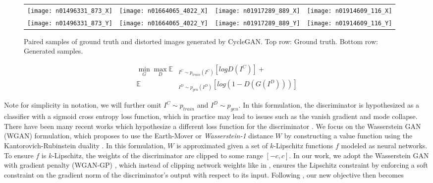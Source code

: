 \documentclass[conference,reqno]{IEEEtran}
\begin{document}
\begin{figure}
\centering
\begin{tabular}{p{1.7cm} p{1.7cm} p{1.7cm} p{1.7cm}}
   
   \texttt{[image: n01496331\_873\_X]} &
   \texttt{[image: n01664065\_4022\_X]} &
   \texttt{[image: n01917289\_889\_X]} &
   \texttt{[image: n01914609\_116\_X]} \\
   \texttt{[image: n01496331\_873\_Y]} &
   \texttt{[image: n01664065\_4022\_Y]} &
   \texttt{[image: n01917289\_889\_Y]} &
   \texttt{[image: n01914609\_116\_Y]} \\

\end{tabular}
\caption{Paired samples of ground truth and distorted images generated by CycleGAN. Top row: Ground truth.
Bottom row: Generated samples.}
\end{figure}


\begin{equation}
\begin{aligned}
   \min\limits_{G}\max\limits_{D} \mathbb{E} & _{I^C \sim p_{train}(I^C)} [logD(I^C)] + \\
   \mathbb{E} & _{I^D \sim p_{gen}(I^D)}[log(1 - D(G(I^D)))]
\end{aligned}
\end{equation}

\noindent Note for simplicity in notation, we will further omit $I^C \sim p_{train}$ and $I^D \sim p_{gen}$. In this
formulation, the discriminator is hypothesized as a classifier with a sigmoid cross entropy loss function, which in
practice may lead to issues such as the vanish gradient and mode collapse. There have been many recent works which
hypothesize a different loss function for the discriminator
\cite{mao2016least,arjovsky2017wasserstein,gulrajani2017improved,zhao2016energy}. We focus on the Wasserstein GAN
(WGAN) \cite{arjovsky2017wasserstein} formulation, which proposes to use the Earth-Mover or \textit{Wasserstein-1}
distance $W$ by constructing a value function using the Kantorovich-Rubinstein duality \cite{villani2008optimal}.
In this formulation, $W$ is approximated given a set of $k$-Lipschitz functions $f$ modeled as neural networks. To
ensure $f$ is $k$-Lipschitz, the weights of the discriminator are clipped to some range $[-c, c]$. In our work, we
adopt the Wasserstein GAN with gradient penalty (WGAN-GP) \cite{gulrajani2017improved}, which instead of clipping
network weights like in \cite{arjovsky2017wasserstein}, ensures the Lipschitz constraint by enforcing a soft
constraint on the gradient norm of the discriminator's output with respect to its input. Following
\cite{gulrajani2017improved}, our new objective then becomes
\end{document}
